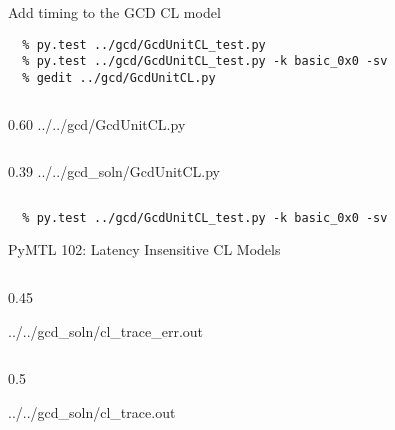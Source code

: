 \begin{task}\begin{frame}[fragile]{Add timing to the GCD CL model}
\vspace{-0.2in}
\begin{Verbatim}[commandchars=\\\{\}]
  % cd    \midtilde/pymtl-tut/build
  % py.test ../gcd/GcdUnitCL_test.py
  % py.test ../gcd/GcdUnitCL_test.py -k basic_0x0 -sv
  % gedit ../gcd/GcdUnitCL.py
\end{Verbatim}

  \begin{cbxcols}
  \begin{column}{0.60\tw}
%
{../../gcd/GcdUnitCL.py}
  \end{column}
  \begin{column}{0.39\tw}
%
{../../gcd_soln/GcdUnitCL.py}
  \end{column}
  \end{cbxcols}

\vspace{-.2in}
\begin{verbatim}
  % py.test ../gcd/GcdUnitCL_test.py -k basic_0x0 -sv
\end{verbatim}
\end{frame}
\end{task}

\begin{frame}{PyMTL 102: Latency Insensitive CL Models}
\vspace{-0.25in}

  \begin{cbxcols}
  \begin{column}{0.45\tw}

%
{../../gcd_soln/cl_trace_err.out}

  \end{column}
  \begin{column}{0.5\tw}

%
{../../gcd_soln/cl_trace.out}

  \end{column}
  \end{cbxcols}

\end{frame}

